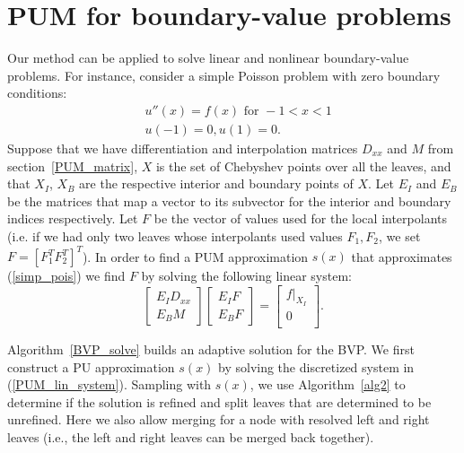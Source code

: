 \section{PUM for boundary-value problems}
\label{PUM_BVP_SEC}
Our method can be applied to solve linear and nonlinear boundary-value problems. For instance, consider a simple Poisson problem with zero boundary conditions:
\begin{equation}
\begin{aligned}
&u''(x) = f(x) \text{ for }-1<x<1 \\
&u(-1)=0, u(1)=0.
\end{aligned}
\label{simp_pois}
\end{equation}
Suppose that we have differentiation and interpolation matrices $D_{xx}$ and $M$ from section~\ref{PUM_matrix}, $X$ is the set of Chebyshev points over all the leaves, and that $X_I$, $X_B$ are the respective interior and boundary points of $X$. Let $E_{I}$ and $E_{B}$ be the matrices that map a vector to its subvector for the interior and boundary indices respectively. Let $F$ be the vector of values used for the local interpolants (i.e. if we had only two leaves whose interpolants used values $F_1,F_2$, we set $F = [F_1^T  F_2^T]^T$). In order to find a PUM approximation $s(x)$ that approximates (\ref{simp_pois}) we find $F$ by solving the following linear system:
\begin{equation}
\begin{bmatrix}
E_{I} D_{xx} \\[1mm] 
 E_{B} M
\end{bmatrix}
\begin{bmatrix}
E_{I} F \\[1mm]
E_{B} F
\end{bmatrix}
=
\begin{bmatrix}
\left . f \right |_{X_I} \\[1mm]
0 \\ 
\end{bmatrix}.
\label{PUM_lin_system}
\end{equation}

Algorithm~\ref{BVP_solve} builds an adaptive solution for the BVP. We first construct a PU approximation $s(x)$ by solving the discretized system in (\ref{PUM_lin_system}). Sampling with $s(x)$, we use Algorithm~\ref{alg2} to determine if the solution is refined and split leaves that are determined to be unrefined. Here we also allow merging for a node with resolved left and right leaves (i.e., the left and right leaves can be merged back together).

